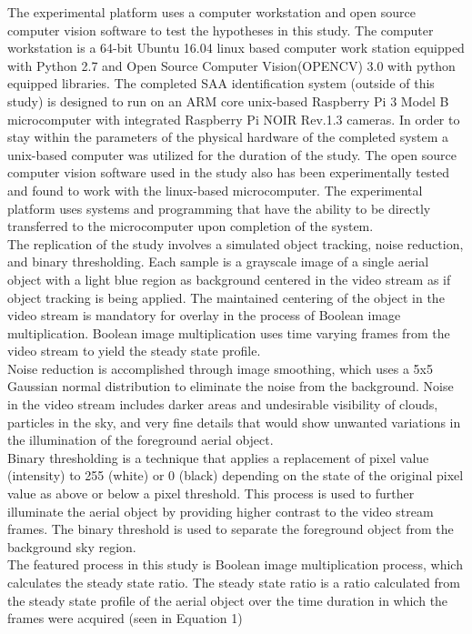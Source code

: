 \indent The experimental platform uses a computer workstation and open source computer vision software to test the hypotheses in this study. The computer workstation is a 64-bit Ubuntu 16.04 linux based computer work station equipped with Python 2.7 and Open Source Computer Vision(OPENCV) 3.0 with python equipped libraries. The completed SAA identification system (outside of this study) is designed to run on an ARM core unix-based Raspberry Pi 3 Model B microcomputer with integrated Raspberry Pi NOIR Rev.1.3 cameras. In order to stay within the parameters of the physical hardware of the completed system a unix-based computer was utilized for the duration of the study. The open source computer vision software used in the study also has been experimentally tested and found to work with the linux-based microcomputer. The experimental platform uses systems and programming that have the ability to be directly transferred to the microcomputer upon completion of the system.\\           
\indent The replication of the study involves a simulated object tracking, noise reduction, and binary thresholding. Each sample is a grayscale image of a single aerial object with a light blue region as background centered in the video stream as if object tracking is being applied. The maintained centering of the object in the video stream is mandatory for overlay in the process of Boolean image multiplication. Boolean image multiplication uses time varying frames from the video stream to yield the steady state profile.\\ 
\indent Noise reduction is accomplished through image smoothing, which uses a 5x5 Gaussian normal distribution to eliminate the noise from the background. Noise in the video stream includes darker areas and undesirable visibility of clouds, particles in the sky, and very fine details that would show unwanted variations in the illumination of the foreground aerial object.\\
\indent Binary thresholding is a technique that applies a replacement of pixel value (intensity) to 255 (white) or 0 (black) depending on the state of the original pixel value as above or below a pixel threshold. This process is used to further illuminate the aerial object by providing higher contrast to the video stream frames. The binary threshold is used to separate the foreground object from the background sky region.\\
\indent The featured process in this study is Boolean image multiplication process, which calculates the steady state ratio. The steady state ratio is a ratio calculated from the steady state profile of the aerial object over the time duration in which the frames were acquired (seen in Equation 1) 

